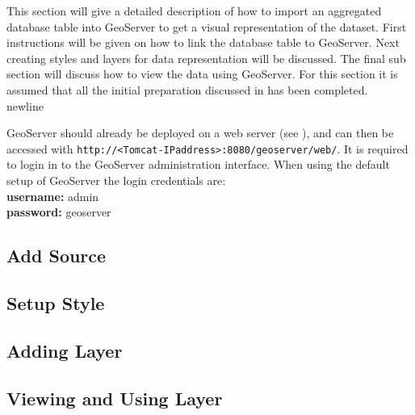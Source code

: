 This section will give a detailed description of how to import an aggregated database table into GeoServer to get a visual representation of the dataset. First instructions will be given on how to link the database table to GeoServer. Next creating styles and layers for data representation will be discussed. The final sub section will discuss how to view the data using GeoServer.  For this section it is assumed that all the initial preparation discussed in  has been completed.\\newline

GeoServer should already be deployed on a web server (see ), and can then be accessed with \lstinline|http://<Tomcat-IPaddress>:8080/geoserver/web/|. It is required to login in to the GeoServer administration interface. When using the default setup of GeoServer the login credentials are: \\
\indent \textbf{username:} admin \\
\indent \textbf{password:} geoserver

\subsection{Add Source}
\label{sec:addingsource}

\pagebreak

\subsection{Setup Style}
\label{sec:addingstyle}


\subsection{Adding Layer}
\label{sec:addinglayers}


\subsection{Viewing and Using Layer}
